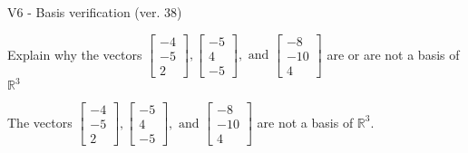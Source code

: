 \begin{exercise}
  \begin{exerciseTitle}V6 - Basis verification (ver. 38)\end{exerciseTitle}
  \begin{exerciseStatement}
    Explain why the vectors \(\left[\begin{array}{r}
-4 \\
-5 \\
2
\end{array}\right] , \left[\begin{array}{r}
-5 \\
4 \\
-5
\end{array}\right] , \text{ and } \left[\begin{array}{r}
-8 \\
-10 \\
4
\end{array}\right]\) are or are not a basis of \(\mathbb{R}^3\)	


  \end{exerciseStatement}
  \begin{exerciseAnswer}
   The vectors \(\left[\begin{array}{r}
-4 \\
-5 \\
2
\end{array}\right] , \left[\begin{array}{r}
-5 \\
4 \\
-5
\end{array}\right] , \text{ and } \left[\begin{array}{r}
-8 \\
-10 \\
4
\end{array}\right]\) 
  	 are not  a basis of \(\mathbb{R}^3\).
  


  \end{exerciseAnswer}
\end{exercise}